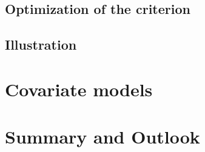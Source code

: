 \begin{equation}
\label{design.eq.varpbar}
\end{equation}


\begin{equation}
\label{eq.varbeta}
\end{equation}



\subsection{Optimization of the criterion}
\label{design.sec.exchange}


\subsection{Illustration}



\section{Covariate models}





\section {Summary and Outlook}


